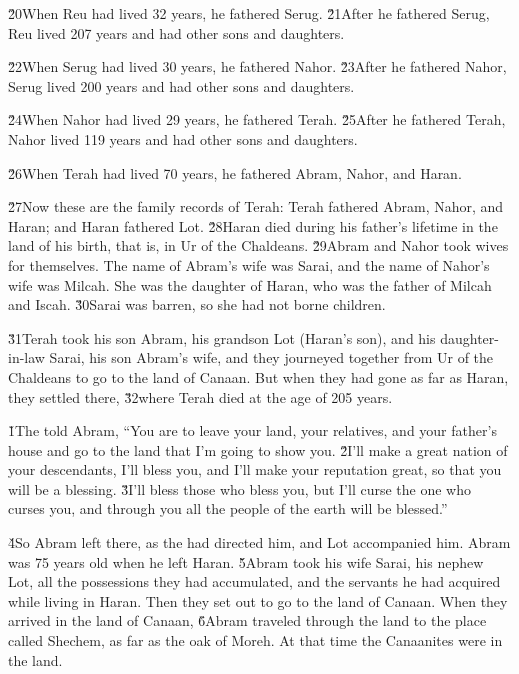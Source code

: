 \v{20}When Reu had lived 32 years, he fathered Serug. \v{21}After he fathered Serug, Reu lived 207 years and had other sons and daughters.

\v{22}When Serug had lived 30 years, he fathered Nahor. \v{23}After he fathered Nahor, Serug lived 200 years and had other sons and daughters.

\v{24}When Nahor had lived 29 years, he fathered Terah. \v{25}After he fathered Terah, Nahor lived 119 years and had other sons and daughters.

\v{26}When Terah had lived 70 years, he fathered Abram, Nahor, and Haran.

\v{27}Now these are the family records of Terah: Terah fathered Abram, Nahor, and Haran; and Haran fathered Lot. \v{28}Haran died during his father's lifetime in the land of his birth, that is, in Ur of the Chaldeans. \v{29}Abram and Nahor took wives for themselves. The name of Abram's wife was Sarai, and the name of Nahor's wife was Milcah. She was the daughter of Haran, who was the father of Milcah and Iscah. \v{30}Sarai was barren, so she had not borne children.

\v{31}Terah took his son Abram, his grandson Lot (Haran's son), and his daughter-in-law Sarai, his son Abram's wife, and they journeyed together from Ur of the Chaldeans to go to the land of Canaan. But when they had gone as far as Haran, they settled there, \v{32}where Terah died at the age of 205 years.

\v{1}The  told Abram, ``You are to leave your land, your relatives, and your father's house and go to the land that I'm going to show you. \v{2}I'll make a great nation of your descendants, I'll bless you, and I'll make your reputation great, so that you will be a blessing. \v{3}I'll bless those who bless you, but I'll curse the one who curses you, and through you all the people of the earth will be blessed.''

\v{4}So Abram left there, as the  had directed him, and Lot accompanied him. Abram was 75 years old when he left Haran. \v{5}Abram took his wife Sarai, his nephew Lot, all the possessions they had accumulated, and the servants he had acquired while living in Haran. Then they set out to go to the land of Canaan. When they arrived in the land of Canaan, \v{6}Abram traveled through the land to the place called Shechem, as far as the oak of Moreh. At that time the Canaanites were in the land.

